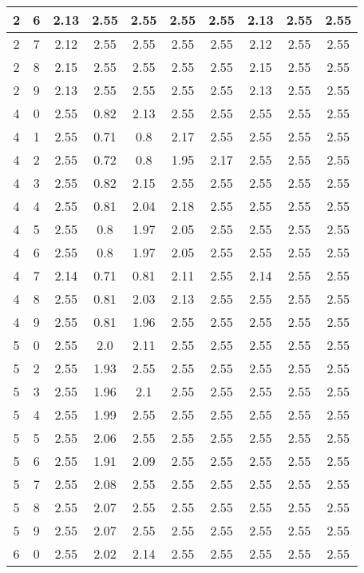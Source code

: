 \begin{longtable}{|c|c||c||c|c|c|c||c|c|c|}
	2 & 6 & 2.13 & 2.55 & 2.55 & 2.55 & 2.55 & 2.13 & 2.55 & 2.55 \\ \hline
	2 & 7 & 2.12 & 2.55 & 2.55 & 2.55 & 2.55 & 2.12 & 2.55 & 2.55 \\ \hline
	2 & 8 & 2.15 & 2.55 & 2.55 & 2.55 & 2.55 & 2.15 & 2.55 & 2.55 \\ \hline
	2 & 9 & 2.13 & 2.55 & 2.55 & 2.55 & 2.55 & 2.13 & 2.55 & 2.55 \\ \hline
	4 & 0 & 2.55 & 0.82 & 2.13 & 2.55 & 2.55 & 2.55 & 2.55 & 2.55 \\ \hline
	4 & 1 & 2.55 & 0.71 & 0.8 & 2.17 & 2.55 & 2.55 & 2.55 & 2.55 \\ \hline
	4 & 2 & 2.55 & 0.72 & 0.8 & 1.95 & 2.17 & 2.55 & 2.55 & 2.55 \\ \hline
	4 & 3 & 2.55 & 0.82 & 2.15 & 2.55 & 2.55 & 2.55 & 2.55 & 2.55 \\ \hline
	4 & 4 & 2.55 & 0.81 & 2.04 & 2.18 & 2.55 & 2.55 & 2.55 & 2.55 \\ \hline
	4 & 5 & 2.55 & 0.8 & 1.97 & 2.05 & 2.55 & 2.55 & 2.55 & 2.55 \\ \hline
	4 & 6 & 2.55 & 0.8 & 1.97 & 2.05 & 2.55 & 2.55 & 2.55 & 2.55 \\ \hline
	4 & 7 & 2.14 & 0.71 & 0.81 & 2.11 & 2.55 & 2.14 & 2.55 & 2.55 \\ \hline
	4 & 8 & 2.55 & 0.81 & 2.03 & 2.13 & 2.55 & 2.55 & 2.55 & 2.55 \\ \hline
	4 & 9 & 2.55 & 0.81 & 1.96 & 2.55 & 2.55 & 2.55 & 2.55 & 2.55 \\ \hline
	5 & 0 & 2.55 & 2.0 & 2.11 & 2.55 & 2.55 & 2.55 & 2.55 & 2.55 \\ \hline
	5 & 2 & 2.55 & 1.93 & 2.55 & 2.55 & 2.55 & 2.55 & 2.55 & 2.55 \\ \hline
	5 & 3 & 2.55 & 1.96 & 2.1 & 2.55 & 2.55 & 2.55 & 2.55 & 2.55 \\ \hline
	5 & 4 & 2.55 & 1.99 & 2.55 & 2.55 & 2.55 & 2.55 & 2.55 & 2.55 \\ \hline
	5 & 5 & 2.55 & 2.06 & 2.55 & 2.55 & 2.55 & 2.55 & 2.55 & 2.55 \\ \hline
	5 & 6 & 2.55 & 1.91 & 2.09 & 2.55 & 2.55 & 2.55 & 2.55 & 2.55 \\ \hline
	5 & 7 & 2.55 & 2.08 & 2.55 & 2.55 & 2.55 & 2.55 & 2.55 & 2.55 \\ \hline
	5 & 8 & 2.55 & 2.07 & 2.55 & 2.55 & 2.55 & 2.55 & 2.55 & 2.55 \\ \hline
	5 & 9 & 2.55 & 2.07 & 2.55 & 2.55 & 2.55 & 2.55 & 2.55 & 2.55 \\ \hline
	6 & 0 & 2.55 & 2.02 & 2.14 & 2.55 & 2.55 & 2.55 & 2.55 & 2.55 \\ \hline

\end{longtable}
